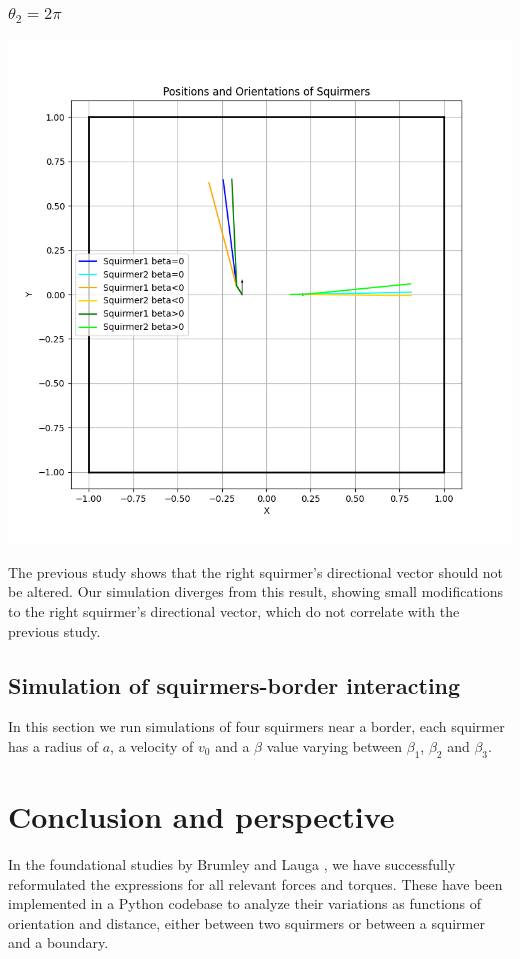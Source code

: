 \documentclass{article}
\begin{document}
\subsubsection{$\theta_2 = 2\pi$}
\begin{center}
   \includegraphics[width=1\textwidth]{graphs/simulations/twosquirmerinter/sq2.2pi.png}
\end{center}
The previous study shows that the right squirmer's directional vector should not be altered. 
Our simulation diverges from this result, showing small modifications to the right squirmer's 
directional vector, which do not correlate with the previous study.

\subsection{Simulation of squirmers-border interacting}
In this section we run simulations of four squirmers near a border, each squirmer has a radius of $a$,
 a velocity of $v_0$ and a $\beta$ value varying between $\beta_1$, $\beta_2$ and $\beta_3$.

 \section{Conclusion and perspective}
 In the foundational studies by Brumley \cite{Brumley} and Lauga \cite{Lauga}, we have successfully reformulated the expressions for all relevant forces and torques. These have been implemented in a Python codebase to analyze their variations as functions of orientation and distance, either between two squirmers or between a squirmer and a boundary.
 
\end{document}
